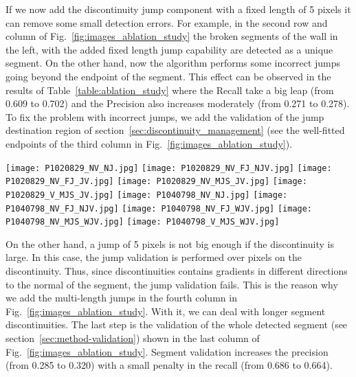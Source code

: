 \documentclass[preprint,12pt]{elsarticle}
\begin{document}
If we now add the discontinuity jump component with a fixed length of 5 pixels it can remove some small detection errors. For example, in the second row and column of Fig.~\ref{fig:images_ablation_study} the broken segments of the wall in the left, with the added fixed length jump capability are detected as a unique segment. On the other hand, now the algorithm performs some incorrect jumps going beyond the endpoint of the segment. This effect can be observed in the results of Table~\ref{table:ablation_study} where the Recall take a big leap (from 0.609 to 0.702) and the Precision also increases moderately (from 0.271 to 0.278). To fix the problem with incorrect jumps, we add the validation of the jump destination region of section~\ref{sec:discontinuity_management} (see the well-fitted endpoints of the third column in Fig.~\ref{fig:images_ablation_study}). 

\begin{figure*}
    \centering
    \texttt{[image: P1020829\_NV\_NJ.jpg]}
    \texttt{[image: P1020829\_NV\_FJ\_NJV.jpg]}
    \texttt{[image: P1020829\_NV\_FJ\_JV.jpg]}
    \texttt{[image: P1020829\_NV\_MJS\_JV.jpg]}
    \texttt{[image: P1020829\_V\_MJS\_JV.jpg]}
\texttt{[image: P1040798\_NV\_NJ.jpg]}
    \texttt{[image: P1040798\_NV\_FJ\_NJV.jpg]}
    \texttt{[image: P1040798\_NV\_FJ\_WJV.jpg]}
    \texttt{[image: P1040798\_NV\_MJS\_WJV.jpg]}
    \texttt{[image: P1040798\_V\_MJS\_WJV.jpg]}
    \caption{Form left to right columns: No Validation no jumps, No validation with fixed size jumps (5 px) and no jump validation, No validation with fixed size jumps (5 px) and jump validation, No validation with multi-size jumps (5, 7, 9 px) and jump validation, Validation with multi-size jumps (5, 7, 9 px) and jump validation}
    \label{fig:images_ablation_study}
\end{figure*}

On the other hand, a jump of 5 pixels is not big enough if the discontinuity is large. In this case, the jump validation is performed over pixels on the discontinuity. Thus, since discontinuities contains gradients in different directions to the normal of the segment, the jump validation fails. This is the reason why we add the multi-length jumps in the fourth column in Fig.~\ref{fig:images_ablation_study}. With it, we can deal with longer segment discontinuities. The last step is the validation of the whole detected segment (see section~\ref{sec:method-validation}) shown in the last column of Fig.~\ref{fig:images_ablation_study}. 
Segment validation increases the precision (from 0.285 to 0.320) with a small penalty in the recall (from 0.686 to 0.664).
\end{document}
